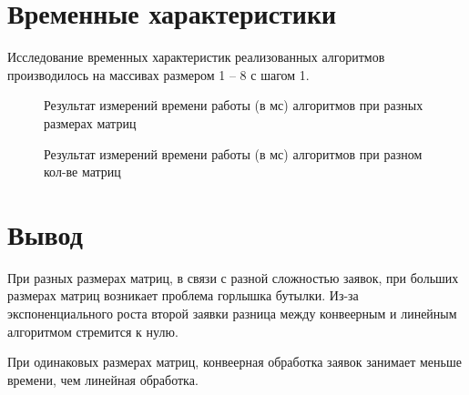 \clearpage

\section{Временные характеристики}


Исследование временных характеристик реализованных алгоритмов производилось на массивах размером 1 -- 8 с шагом 1.

\begin{figure}[ht!]
	\centering
	
	\caption{Результат измерений времени работы (в мс) алгоритмов при разных размерах матриц\label{overflow}}
	\label{fig:plotting_data1}
	\end{figure}
\clearpage

\begin{figure}[ht!]
	\centering
	
	\caption{Результат измерений времени работы (в мс) алгоритмов при разном кол-ве матриц\label{overflow}}
	\label{fig:plotting_data2}
	\end{figure}


\section{Вывод}

При разных размерах матриц, в связи с разной сложностью заявок, при больших размерах матриц возникает проблема горлышка бутылки. Из-за экспоненциального роста второй заявки разница между конвеерным и линейным алгоритмом стремится к нулю.

При одинаковых размерах матриц, конвеерная обработка заявок занимает меньше времени, чем линейная обработка.